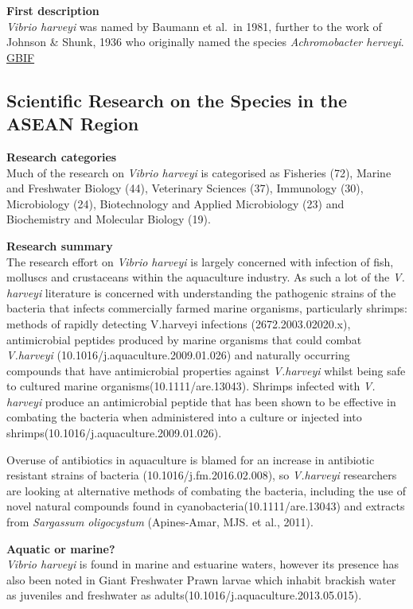 \documentclass[]{book}
\theoremstyle{definition}
\theoremstyle{definition}
\theoremstyle{definition}
\theoremstyle{remark}
\begin{document}
\textbf{First description}\\
\emph{Vibrio harveyi} was named by Baumann et al.~in 1981, further to
the work of Johnson \& Shunk, 1936 who originally named the species
\emph{Achromobacter herveyi}.
\href{https://www.gbif.org/species/5427692}{GBIF}

\hypertarget{scientific-research-on-the-species-in-the-asean-region-5}{%
\subsection{Scientific Research on the Species in the ASEAN
Region}\label{scientific-research-on-the-species-in-the-asean-region-5}}

\textbf{Research categories}\\
Much of the research on \emph{Vibrio harveyi} is categorised as
Fisheries (72), Marine and Freshwater Biology (44), Veterinary Sciences
(37), Immunology (30), Microbiology (24), Biotechnology and Applied
Microbiology (23) and Biochemistry and Molecular Biology (19).

\textbf{Research summary}\\
The research effort on \emph{Vibrio harveyi} is largely concerned with
infection of fish, molluscs and crustaceans within the aquaculture
industry. As such a lot of the \emph{V. harveyi} literature is concerned
with understanding the pathogenic strains of the bacteria that infects
commercially farmed marine organisms, particularly shrimps: methods of
rapidly detecting V.harveyi infections (2672.2003.02020.x),
antimicrobial peptides produced by marine organisms that could combat
\emph{V.harveyi} (10.1016/j.aquaculture.2009.01.026) and naturally
occurring compounds that have antimicrobial properties against
\emph{V.harveyi} whilst being safe to cultured marine
organisms(10.1111/are.13043). Shrimps infected with \emph{V. harveyi}
produce an antimicrobial peptide that has been shown to be effective in
combating the bacteria when administered into a culture or injected into
shrimps(10.1016/j.aquaculture.2009.01.026).

Overuse of antibiotics in aquaculture is blamed for an increase in
antibiotic resistant strains of bacteria (10.1016/j.fm.2016.02.008), so
\emph{V.harveyi} researchers are looking at alternative methods of
combating the bacteria, including the use of novel natural compounds
found in cyanobacteria(10.1111/are.13043) and extracts from
\emph{Sargassum oligocystum} (Apines-Amar, MJS. et al., 2011).

\textbf{Aquatic or marine?}\\
\emph{Vibrio harveyi} is found in marine and estuarine waters, however
its presence has also been noted in Giant Freshwater Prawn larvae which
inhabit brackish water as juveniles and freshwater as
adults(10.1016/j.aquaculture.2013.05.015).
\end{document}
